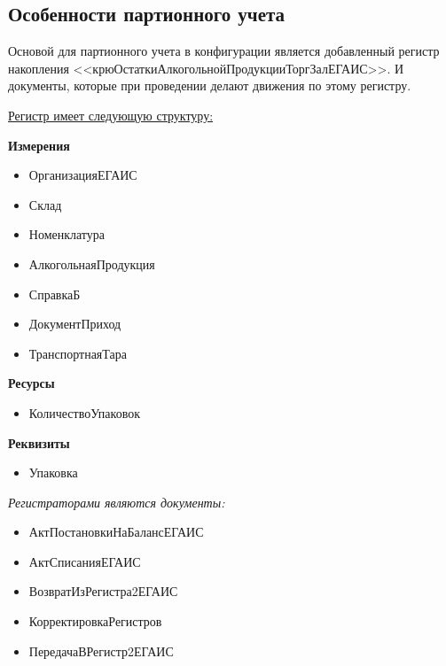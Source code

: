 \subsection{Особенности партионного учета}

Основой для партионного учета в конфигурации является добавленный регистр накопления <<крюОстаткиАлкогольнойПродукцииТоргЗалЕГАИС>>. И документы, которые при проведении делают движения по этому регистру. \par
\noindent \underline{Регистр имеет следующую структуру:}

\vspace{\baselineskip}
\begin{minipage}{0.5\textwidth}
        \noindent\textbf{Измерения}
        \begin{itemize}
            \item ОрганизацияЕГАИС
            \item Склад
            \item Номенклатура
            \item АлкогольнаяПродукция
            \item СправкаБ
            \item ДокументПриход
            \item ТранспортнаяТара
        \end{itemize}
        \textbf{Ресурсы}
        \begin{itemize}
            \item КоличествоУпаковок
        \end{itemize}
        \textbf{Реквизиты}
        \begin{itemize}
            \item Упаковка
        \end{itemize}
        \vspace{\baselineskip}
\end{minipage}
\hfill
\begin{minipage}{0.5\textwidth}
      \noindent\textit{Регистраторами являются документы:}

       \begin{itemize}
           \item АктПостановкиНаБалансЕГАИС
           \item АктСписанияЕГАИС
           \item ВозвратИзРегистра2ЕГАИС
           \item КорректировкаРегистров
           \item ПередачаВРегистр2ЕГАИС
       \end{itemize}
\end{minipage}

